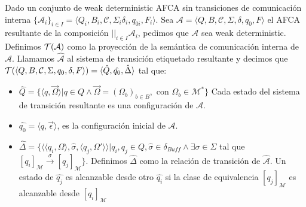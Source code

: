 \begin{definition}
Dado un conjunto de weak deterministic AFCA sin transiciones de comunicación interna $\{ \mathcal{A}_i \}_{i \in I} = \langle Q_i, B_i, \mathcal{C}, \Sigma_i \delta_i, q_{0i}, F_i \rangle$. Sea $\mathcal{A} = \langle Q, B, \mathcal{C}, \Sigma, \delta, q_0, F \rangle$ el AFCA resultante de la composición $||_{i \in I}\mathcal{A}_i$, pedimos que $\mathcal{A}$ sea weak deterministic. Definimos $\mathcal{T}(\mathcal{A})$ como la proyección de la semántica de comunicación interna de $\mathcal{A}$. Llamamos $\hat{\mathcal{A}}$ al sistema de transición etiquetado resultante y decimos que $\mathcal{T} (\langle Q, B, \mathcal{C}, \Sigma, q_0, \delta, F \rangle)= \langle \hat{Q}, \hat{q_0}, \hat{\Delta} \rangle$ tal que:
\begin{itemize}
    \item $ \hat{Q} = \{ \langle q, \overrightarrow{\Omega} \rangle | q \in Q \land \overrightarrow{\Omega} = (\Omega_b)_{b \in B},$ con $\Omega_b \in \mathcal{M}^* \}$ Cada estado del sistema de transición resultante es una configuración de $\mathcal{A}$.
    \item $\hat{q_0} = \langle q, \overrightarrow{\epsilon} \rangle$, es la configuración inicial de $\mathcal{A}$.
    \item $\hat{\Delta}= \{\langle \langle q_i, \Omega \rangle, \hat{\sigma},\langle q_j, \Omega' \rangle \rangle | q_i,q_j \in Q, \hat{\sigma} \in \delta_{Buff} \land \exists \sigma \in \Sigma$ tal que  $[q_i]_\mathcal{M} \xrightarrow{\sigma} [q_j]_\mathcal{M} \}$. Definimos $\hat{\Delta}$ como la relación de transición de $\hat{\mathcal{A}}$. Un estado de $\hat{q_j}$ es alcanzable desde otro $\hat{q_i}$ si la clase de equivalencia $[q_j]_\mathcal{M}$ es alcanzable desde $[q_i]_\mathcal{M}$
    
\end{itemize}
\end{definition}

